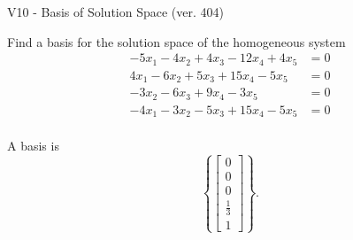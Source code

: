 \begin{exercise}
  \begin{exerciseTitle}V10 - Basis of Solution Space (ver. 404)\end{exerciseTitle}
  \begin{exerciseStatement}
    Find a basis for the solution space of the homogeneous system 
\begin{align*}
 -5 x_ 1 -4 x_ 2 + 4 x_ 3 -12 x_ 4 + 4 x_ 5 &= 0  \\ 
  4 x_ 1 -6 x_ 2 + 5 x_ 3 + 15 x_ 4 -5 x_ 5 &= 0  \\ 
  -3 x_ 2 -6 x_ 3 + 9 x_ 4 -3 x_ 5 &= 0  \\ 
  -4 x_ 1 -3 x_ 2 -5 x_ 3 + 15 x_ 4 -5 x_ 5 &= 0  \\ 
 \end{align*}


 
  \end{exerciseStatement}

  \begin{exerciseAnswer}
   A basis is   
\[\left\{\left[\begin{array}{c}
0 \\
0 \\
0 \\
\frac{1}{3} \\
1
\end{array}\right]\right\}.\]

  


  \end{exerciseAnswer}
\end{exercise}